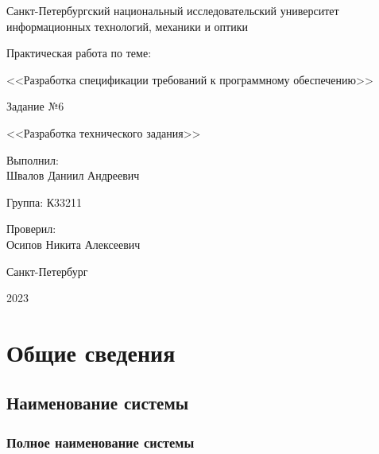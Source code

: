\documentclass[a4paper, 14pt]{extarticle}
\begin{document}
\begin{titlepage}
  \vspace{0pt plus2fill}
  \noindent

  \vspace{0pt plus6fill}
  \begin{center}
    Санкт-Петербургский национальный исследовательский университет
    информационных технологий, механики и оптики

    \vspace{0pt plus2fill}

    Практическая работа по теме:

    <<Разработка спецификации требований к программному обеспечению>>

    \vspace{0pt plus1fill}

    Задание №6

    <<Разработка технического задания>>

  \end{center}

  \vspace{0pt plus7fill}
  \begin{flushright}
    Выполнил: \\
    Швалов Даниил Андреевич

    Группа: К33211

    Проверил: \\
    Осипов Никита Алексеевич
  \end{flushright}

  \vspace{0pt plus2fill}
  \begin{center}
    Санкт-Петербург

    2023
  \end{center}
\end{titlepage}

\setcounter{page}{2}

\section{Общие сведения}

\subsection{Наименование системы}

\subsubsection{Полное наименование системы}
\end{document}
